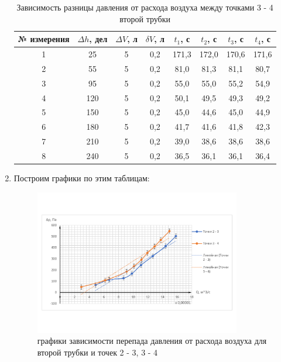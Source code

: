\documentclass[11pt,a4paper]{article}
\begin{document}
\begin{enumerate}
\begin{table}[h!]
\centering
\begin{tabular}{|c|c|c|c|c|c|c|c|}
\hline
№ измерения & $\Delta h$, дел & $\Delta V$, л & $\delta V$, л & $t_{1}$, с & $t_{2}$, с & $t_{3}$, с & $t_{4}$, с \\ \hline
1           & 25              & 5             & 0,2           & 171,3     & 172,0    & 170,6     & 171,6     \\ \hline
2           & 55              & 5             & 0,2           & 81,0      & 81,3      & 81,1      & 80,7      \\ \hline
3           & 95              & 5             & 0,2           & 55,0      & 55,0      & 55,2      & 54,9      \\ \hline
4           & 120             & 5             & 0,2           & 50,1      & 49,5      & 49,3      & 49,2      \\ \hline
5           & 150             & 5             & 0,2           & 45,0      & 44,6      & 45,0      & 44,9      \\ \hline
6           & 180             & 5             & 0,2           & 41,7      & 41,6      & 41,8      & 42,3      \\ \hline
7           & 210             & 5             & 0,2           & 39,0      & 38,6      & 38,6      & 38,6      \\ \hline
8           & 240             & 5             & 0,2           & 36,5      & 36,1       & 36,1      & 36,4      \\ \hline
\end{tabular}
\caption{Зависимость разницы давления от расхода воздуха между точками 3 - 4 второй трубки}
\label{tab:flow_measuring_3_4_second_tube}
\end{table}

\item Построим графики по этим таблицам:

\begin{figure}[h!]
	\begin{center}
		\includegraphics[width = 0.85\textwidth]{Results_of_measuring}
		\caption{графики зависимости перепада давления от расхода воздуха для второй трубки и точек 2 - 3, 3 - 4}
		\label{fig:graph_1}
	\end{center}
\end{figure}


\end{enumerate}
\end{document}
